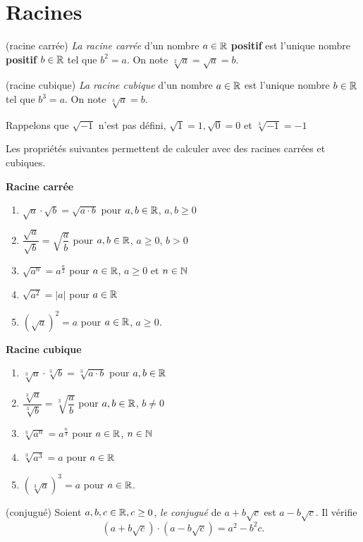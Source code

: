 \documentclass[a4paper,12pt]{report}
\begin{document}
\section{Racines}
\begin{defi}(racine carrée)
	\emph{La racine carrée} d'un nombre $a\in \mathbb R$ {\bfseries positif} est l'unique nombre {\bfseries positif} $b\in \mathbb R$ tel que $b^2=a$. On note $\sqrt[2]{a}=\sqrt{a}=b$. 
\end{defi}
\begin{defi}(racine cubique)
	\emph{La racine cubique} d'un nombre $a\in \mathbb R$ est l'unique nombre $b\in \mathbb R$ tel que $b^3=a$. On note $\sqrt[3]{a}=b$. 
\end{defi}
Rappelons que $\sqrt{-1}$ n'est pas défini, $\sqrt{1}=1, \sqrt{0}=0$ et $\sqrt[3]{-1}=-1$
\begin{proprietes}
Les propriétés suivantes permettent de calculer avec des racines carrées et cubiques.

\begin{minipage}[t]{0.5\textwidth}{
\vspace{0pt}
\begin{center}
	{\bfseries Racine carrée}
	\begin{enumerate}[label={\arabic*)}]
\item $\sqrt{a}\cdot \sqrt{b}=\sqrt{a\cdot b}$ pour $a,b\in \mathbb R$, $a,b\geq 0$
\item $\dfrac{\sqrt{a}}{\sqrt{b}}=\sqrt{\dfrac{a}{b}}$ pour $a,b\in \mathbb R$, $a\geq 0$, $b>0$
\item $\sqrt{a^n}=a^{\frac{n}{2}}$ pour $a\in \mathbb R$, $a\geq 0$ et $n\in \mathbb N$
\item $\sqrt{a^2}=\lvert a\rvert$ pour $a\in \mathbb R$
\item $(\sqrt{a})^2=a$ pour $a\in \mathbb R$, $a\geq 0$. 
\end{enumerate}
\end{center}

}
\end{minipage}
\begin{minipage}[t]{0.5\textwidth}{
\vspace{0pt}
{\bfseries Racine cubique}
\begin{center}
	\begin{enumerate}[label={\arabic*)}]
		\item $\sqrt[3]{a}\cdot \sqrt[3]{b}=\sqrt[3]{a\cdot b}$ pour $a,b\in \mathbb R$
		\item $\dfrac{\sqrt[3]{a}}{\sqrt[3]{b}}=\sqrt[3]{\dfrac{a}{b}}$ pour $a,b\in \mathbb R$, $b\neq 0$
		\item $\sqrt[3]{a^n}=a^{\frac{n}{3}}$ pour $a\in \mathbb R$, $n\in \mathbb N$
		\item $\sqrt[3]{a^3}=a$ pour $a\in \mathbb R$
		\item $(\sqrt[3]{a})^3=a$ pour $a\in \mathbb R$. 
\end{enumerate}
\end{center}

}
\end{minipage}
\end{proprietes}
\begin{defi}(conjugué)
	Soient $a,b,c\in \mathbb R, c\geq 0$, \emph{le conjugué} de $a+b\sqrt{c}$ est $a-b\sqrt{c}$. Il vérifie \[(a+b\sqrt{c})\cdot (a-b\sqrt{c})=a^2-b^2c.\] 
\end{defi}
\end{document}
